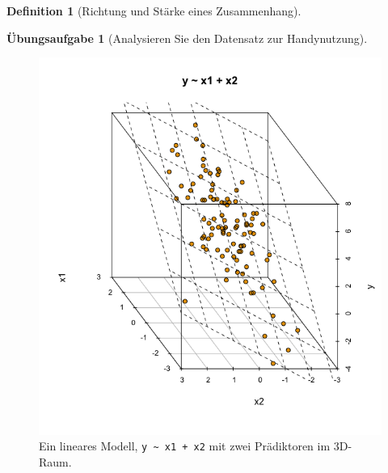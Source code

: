 \documentclass[
  a4paper,
  DIV=11]{scrreprt}
\theoremstyle{definition}
\newtheorem{exercise}{Übungsaufgabe}[chapter]
\theoremstyle{definition}
\theoremstyle{definition}
\newtheorem{definition}{Definition}[chapter]
\theoremstyle{remark}
\begin{document}
\begin{definition}[Richtung und Stärke eines
Zusammenhang]
\begin{exercise}[Analysieren Sie den Datensatz zur
Handynutzung]
\begin{figure}
\begin{minipage}{0.33\linewidth}
\end{minipage}%
%
\begin{minipage}{0.33\linewidth}

\includegraphics{img/3d_scatter3.png}

\end{minipage}%

\caption{\label{fig-3d-regr-statisch}Ein lineares Modell,
\texttt{y\ \textasciitilde{}\ x1\ +\ x2} mit zwei Prädiktoren im
3D-Raum.}

\end{figure}%

\begin{figure}

\end{figure}
\end{exercise}
\end{definition}
\end{document}
